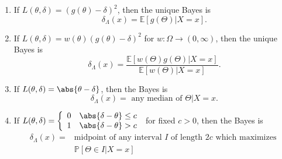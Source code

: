 \documentclass[a4paper]{article}
\begin{document}
\begin{cor}
	\quad
	\begin{enumerate}
		\item If $L(\theta,\delta) = (g(\theta)-\delta)^2$, then the unique Bayes is
		\begin{equation}
			\delta_{\Lambda}(x) = \mathbb{E}[g(\Theta)|X=x].
		\end{equation}
		\item If $L(\theta,\delta) = w(\theta)(g(\theta)-\delta)^2$ for $w: \Omega \to (0,\infty)$, then the unique Bayes is
		\begin{equation}
			\delta_{\Lambda}(x) = \frac{\mathbb{E}[w(\Theta)g(\Theta)|X=x]}{\mathbb{E}[w(\Theta)|X=x]}.
		\end{equation}
		\item If $L(\theta,\delta) = \abs{\theta - \delta}$, then the Bayes is
		\begin{equation}
			\delta_{\Lambda}(x) = \text{ any median of } \Theta|X=x.
		\end{equation}
		\item If $L(\theta,\delta) = \left\{ 
		\begin{array}{ll}
			0 & \abs{\delta-\theta} \leq c\\
			1 & \abs{\delta-\theta} > c
		\end{array} \right.$ for fixed $c > 0$, then the Bayes is
		\begin{equation}
			\begin{aligned}
				\delta_{\Lambda}(x) = & \text{midpoint of any interval } I \text{ of length } 2c \text{ which maximizes } \\
				& \mathbb{P}[\Theta \in I | X = x]
			\end{aligned}
		\end{equation}
	\end{enumerate}
\end{cor}
\end{document}
